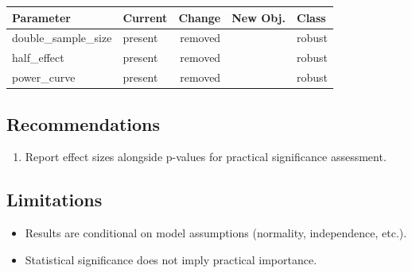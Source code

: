 \documentclass[11pt, a4paper]{article}
\begin{document}
\begin{longtable}{llrrl}
\toprule
\textbf{Parameter} & \textbf{Current} & \textbf{Change} & \textbf{New Obj.} & \textbf{Class} \\
\midrule
\endhead
double\_sample\_size & present & removed &  &
\textcolor{polyagreen}{robust} \\
half\_effect & present & removed &  &
\textcolor{polyagreen}{robust} \\
power\_curve & present & removed &  &
\textcolor{polyagreen}{robust} \\
\bottomrule
\end{longtable}


\subsection{Recommendations}

\begin{enumerate}
  \item Report effect sizes alongside p-values for practical significance assessment.
\end{enumerate}

\subsection{Limitations}

\begin{polyawarnbox}
\begin{itemize}
  \item Results are conditional on model assumptions (normality, independence, etc.).
  \item Statistical significance does not imply practical importance.
\end{itemize}
\end{polyawarnbox}

\end{document}
